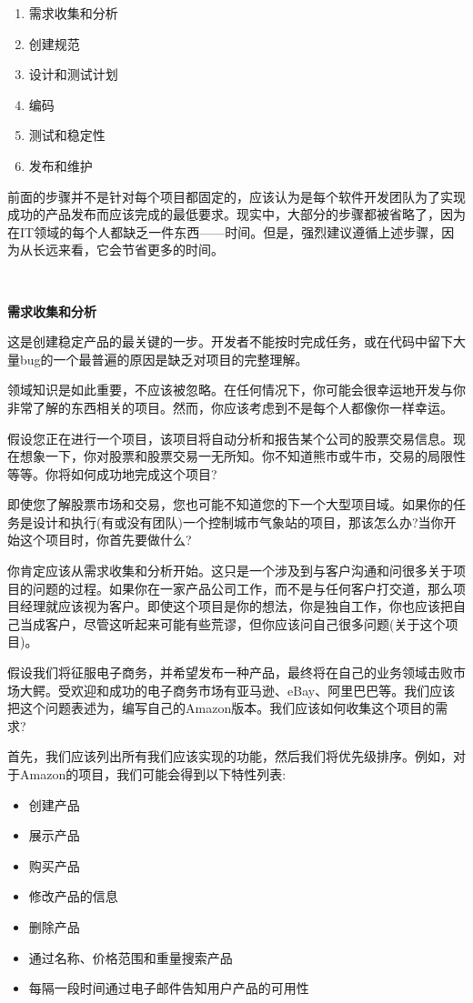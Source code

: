\begin{enumerate}
	\item 需求收集和分析
	\item 创建规范
	\item 设计和测试计划
	\item 编码
	\item 测试和稳定性
	\item 发布和维护
\end{enumerate}

前面的步骤并不是针对每个项目都固定的，应该认为是每个软件开发团队为了实现成功的产品发布而应该完成的最低要求。现实中，大部分的步骤都被省略了，因为在IT领域的每个人都缺乏一件东西——时间。但是，强烈建议遵循上述步骤，因为从长远来看，它会节省更多的时间。 \par

\noindent\textbf{}\ \par
\textbf{需求收集和分析} \ \par
这是创建稳定产品的最关键的一步。开发者不能按时完成任务，或在代码中留下大量bug的一个最普遍的原因是缺乏对项目的完整理解。 \par
领域知识是如此重要，不应该被忽略。在任何情况下，你可能会很幸运地开发与你非常了解的东西相关的项目。然而，你应该考虑到不是每个人都像你一样幸运。 \par
假设您正在进行一个项目，该项目将自动分析和报告某个公司的股票交易信息。现在想象一下，你对股票和股票交易一无所知。你不知道熊市或牛市，交易的局限性等等。你将如何成功地完成这个项目? \par
即使您了解股票市场和交易，您也可能不知道您的下一个大型项目域。如果你的任务是设计和执行(有或没有团队)一个控制城市气象站的项目，那该怎么办?当你开始这个项目时，你首先要做什么? \par
你肯定应该从需求收集和分析开始。这只是一个涉及到与客户沟通和问很多关于项目的问题的过程。如果你在一家产品公司工作，而不是与任何客户打交道，那么项目经理就应该视为客户。即使这个项目是你的想法，你是独自工作，你也应该把自己当成客户，尽管这听起来可能有些荒谬，但你应该问自己很多问题(关于这个项目)。 \par
假设我们将征服电子商务，并希望发布一种产品，最终将在自己的业务领域击败市场大鳄。受欢迎和成功的电子商务市场有亚马逊、eBay、阿里巴巴等。我们应该把这个问题表述为，编写自己的Amazon版本。我们应该如何收集这个项目的需求? \par
首先，我们应该列出所有我们应该实现的功能，然后我们将优先级排序。例如，对于Amazon的项目，我们可能会得到以下特性列表: \par

\begin{itemize}
	\item 创建产品
	\item 展示产品
	\item 购买产品
	\item 修改产品的信息
	\item 删除产品
	\item 通过名称、价格范围和重量搜索产品
	\item 每隔一段时间通过电子邮件告知用户产品的可用性
\end{itemize}

